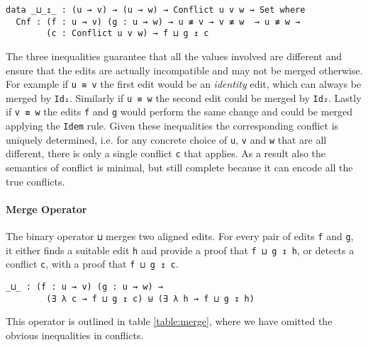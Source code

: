 \documentclass[preprint]{sigplanconf}
\begin{document}
\begin{verbatim}
data _⊔_↥_ : (u ⇝ v) → (u ⇝ w) → Conflict u v w → Set where
  Cnf : (f : u ⇝ v) (g : u ⇝ w) → u ≢ v → v ≢ w  → u ≢ w → 
        (c : Conflict u v w) → f ⊔ g ↥ c
\end{verbatim}

	The three inequalities guarantee that all the values involved are different
        and ensure that the edits are actually incompatible and may not be merged 
        otherwise. For example if \texttt{u ≡ v} the first edit would be an
        \emph{identity} edit, which can always be merged by
        \texttt{Id₁}. Similarly if \texttt{u ≡ w} the second edit could be merged
        by \texttt{Id₂}. Lastly if \texttt{v ≡ w} the edits \texttt{f} and \texttt{g}
        would perform the same change and could be merged applying the \texttt{Idem}
        rule.
        Given these inequalities the corresponding conflict is uniquely determined,
        i.e. for any concrete choice of \texttt{u}, \texttt{v} and \texttt{w} that
        are all different, there is only a single conflict \texttt{c} that applies.
	As a result also the semantics of conflict is minimal, but still complete
        because it can encode all the true conflicts.

	\paragraph{Merge Operator}
	The binary operator \texttt{⊔} merges 
	two aligned edits. For every pair of edits \texttt{f} and \texttt{g}, 
	it either finds a suitable edit \texttt{h} and provide
	a proof that \texttt{f ⊔ g ↧ h}, or detects a conflict \texttt{c}, 
	with a proof that \texttt{f ⊔ g ↥ c}.

\begin{verbatim}
_⊔_ : (f : u ⇝ v) (g : u ⇝ w) →
        (∃ λ c → f ⊔ g ↥ c) ⊎ (∃ λ h → f ⊔ g ↧ h)
\end{verbatim}
	This operator is outlined in table \ref{table:merge}, where we have
        omitted the obvious inequalities in conflicts.
\end{document}
